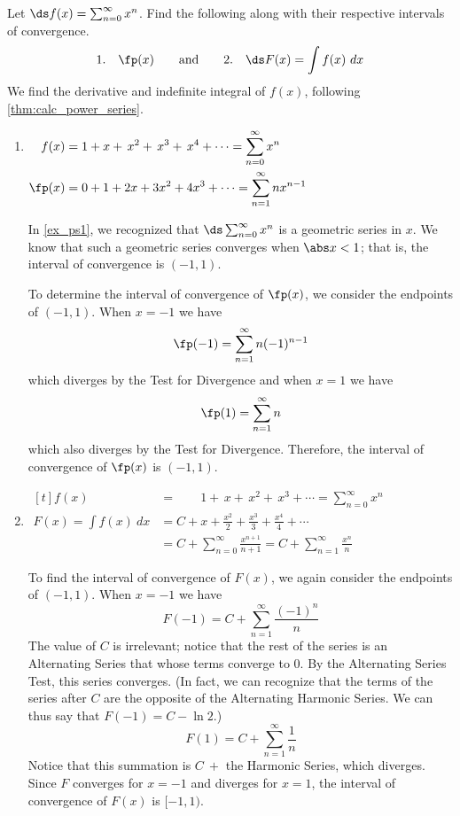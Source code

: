 \begin{example}\label{ex_ps3}
Let $\ds f(x) = \sum_{n=0}^\infty x^n$. Find the following along with their respective intervals of convergence.
\[
 \text{1.}\quad\fp(x)
 \qquad\text{and}\qquad
 \text{2.}\quad\ds F(x) =\int f(x)\ dx
\]
\solution
We find the derivative and indefinite integral of $f(x)$, following \autoref{thm:calc_power_series}.

\begin{enumerate}
\item\hfill$\begin{aligned}[t]
f(x)&=1+x+\,x^2+\,x^3+\,x^4+\dotsb = \sum_{n=0}^\infty x^n\\
\fp(x) &= 0+1+2x+3x^2+4x^3+\dotsb=\sum_{n=1}^\infty nx^{n-1} 
\end{aligned}$\hfill\null

In \autoref{ex_ps1}, we recognized that $\ds \sum_{n=0}^\infty x^n$ is a geometric series in $x$. We know that such a geometric series converges when $\abs x<1$; that is, the interval of convergence is $(-1,1)$.

To determine the interval of convergence of $\fp(x)$, we consider the endpoints of $(-1,1)$.
When $x=-1$ we have
\[\fp(-1) = \sum_{n=1}^\infty n(-1)^{n-1}\]
which diverges by the Test for Divergence
and when $x=1$ we have
\[\fp(1) = \sum_{n=1}^\infty n\]
which also diverges by the Test for Divergence. Therefore, the interval of convergence of $\fp(x)$ is $(-1,1)$. 

\item\hfill$\begin{aligned}[t]
 f(x)&=\phantom{C+{}}1+\,x+\,x^2+\,x^3+\dotsb = \sum_{n=0}^\infty x^n\\
 F(x) = \int f(x)\ dx &= C+ x+\frac{x^2}{2}+\frac{x^3}3+\frac{x^4}4+\dotsb \\
 &= C+\sum_{n=0}^\infty \frac{x^{n+1}}{n+1}=C+\sum_{n=1}^\infty \frac{x^{n}}{n}  
\end{aligned}$\hfill\null

To find the interval of convergence of $F(x)$, we again consider the endpoints of $(-1,1)$.
When $x=-1$ we have
\[F(-1) = C+\sum_{n=1}^\infty \frac{(-1)^{n}}{n}\]
The value of $C$ is irrelevant; notice that the rest of the series is an Alternating Series that whose terms converge to 0. By the Alternating Series Test, this series converges. (In fact, we can recognize that the terms of the series after $C$ are the opposite of the Alternating Harmonic Series. We can thus say that $F(-1) = C-\ln 2$.)
\[F(1) = C+\sum_{n=1}^\infty \frac{1}{n} \]
Notice that this summation is $C\ +$ the Harmonic Series, which diverges. Since $F$ converges for $x=-1$ and diverges for $x=1$, the interval of convergence of $F(x)$ is $[-1,1)$.
\end{enumerate}
\end{example}

